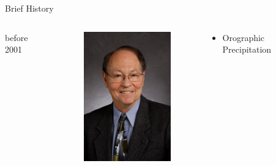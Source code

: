 \documentclass[hide notes,intlimits]{beamer}
\begin{document}
\begin{frame}{Brief History}

  
  \begin{columns}[c]
    \begin{column}{.1\linewidth}
      before 2001
    \end{column}
    \begin{column}{.1\linewidth}
      \begin{figure}
        \includegraphics[width=\textwidth]{craig_lingle}
      \end{figure}
    \end{column}
    \begin{column}{.55\linewidth}
      \begin{itemize}
      \item Orographic Precipitation

\end{itemize}
\end{column}
\end{columns}
\end{frame}
\end{document}
